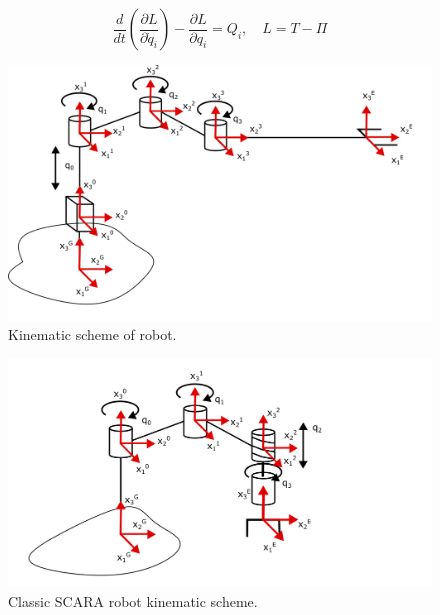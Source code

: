 \documentclass[conference]{IEEEtran}
\begin{document}
\begin{equation}
\frac{d}{dt} \left( \frac{\partial L}{\partial \dot{q}_i} \right) - \frac{\partial L}{\partial q_i} = Q_i, \quad L = T - \Pi
\label{eq:lagrange}
\end{equation}

\begin{figure}[htbp]
    \centering
    \includegraphics[width=\linewidth]{waffer robot.png}
    \caption{Kinematic scheme of robot.}
    \label{fig:wafer_robot}
\end{figure}


\begin{figure}[htbp]
    \centering
    \includegraphics[width=\linewidth]{default scara.png}
    \caption{Classic SCARA robot kinematic scheme.}
    \label{fig:classic_scara}
\end{figure}
\end{document}
